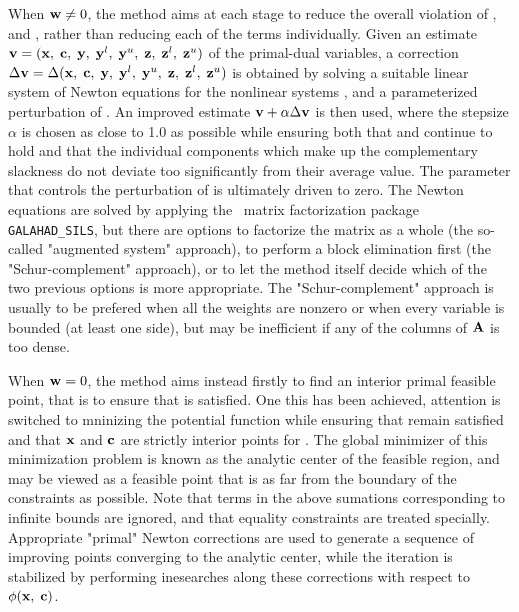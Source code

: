 \documentclass{galahad}
\begin{document}
When ${\mathbf{w}} \neq 0$, the method aims at each stage to reduce the
overall violation of ,  and ,
rather than reducing each of the terms individually. Given an estimate
${\mathbf{v}} = ({\mathbf{x}}, \; {\mathbf{c}}, \; {\mathbf{y}}, \; {\mathbf{y}}^{l}, \;
{\mathbf{y}}^{u}, \; {\mathbf{z}}, \; {\mathbf{z}}^{l}, \; {\mathbf{z}}^{u})$
of the primal-dual variables, a correction
$\Delta {\mathbf{v}} = \Delta ({\mathbf{x}}, \; {\mathbf{c}}, \; {\mathbf{y}}, \; {\mathbf{y}}^{l},
 \; {\mathbf{y}}^{u} ,\;{\mathbf{z}},\;{\mathbf{z}}^{l} ,\;{\mathbf{z}}^{u} )$
is obtained by solving a suitable linear system of Newton equations for the
nonlinear systems ,  and a parameterized perturbation of
. An improved estimate ${\mathbf{v}} + \alpha \Delta {\mathbf{v}}$
is then used, where the stepsize $\alpha$
is chosen as close to 1.0 as possible while ensuring both that
 and  continue to hold and that the individual components
which make up the complementary slackness
 do not deviate too significantly
from their average value. The parameter that controls the perturbation
of  is ultimately driven to zero.
The Newton equations are solved  by applying the
\galahad\ matrix factorization package
{\tt GALAHAD\_SILS}, but there are options
to factorize the matrix as a whole (the so-called "augmented system"
approach), to perform a block elimination first (the "Schur-complement"
approach), or to let the method itself decide which of the two
previous options is more appropriate.
The "Schur-complement" approach is usually to be prefered when all the
weights are nonzero or when every variable is bounded (at least one side),
but may be inefficient if any of the columns of ${\mathbf{A}}$ is too dense.

When ${\mathbf{w}} = 0$, the method aims instead firstly to find an interior
primal feasible point, that is to ensure that  is satisfied.
One this has been achieved, attention is switched to mninizing the
potential function
while ensuring that  remain satisfied and that
${\mathbf{x}}$ and ${\mathbf{c}}$ are strictly interior points for .
The global minimizer of this minimization problem is known as the
analytic center of the feasible region, and may be viewed as
a feasible point that is as far from the boundary of the constraints as
possible.
Note that terms in the above sumations corresponding to infinite bounds are
ignored, and that equality constraints are treated specially.
Appropriate "primal" Newton corrections are used to generate a sequence
of improving points converging to the analytic center, while the iteration
is stabilized by performing inesearches along these corrections with respect to
$\phi ({\mathbf{x}},\;{\mathbf{c}})$.
\end{document}
